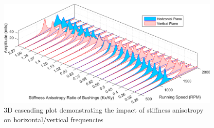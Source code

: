 		\begin{figure}[H]
			\centering
			\includegraphics[width=.75\linewidth]{./figures/Images/Figure_6.png}
			\caption{3D cascading plot demonstrating the impact of stiffness anisotropy on horizontal/vertical frequencies}
			\label{fig:Figure_6}
		\end{figure}

